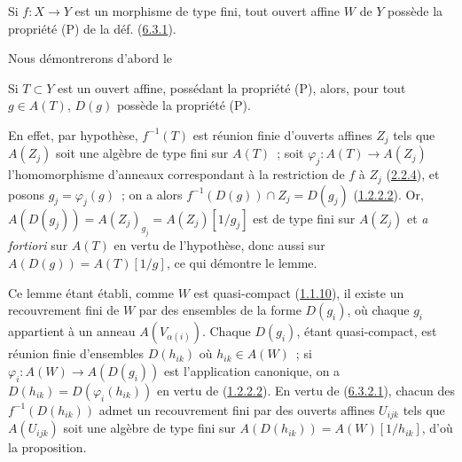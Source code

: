 \begin{proposition}[6.3.2]
\label{I.6.3.2-fr}
Si $f:X\to Y$ est un morphisme de type fini, tout ouvert affine $W$ de $Y$
possède la propriété (P) de la déf. (\hyperref[I.6.3.1-fr]{6.3.1}).
\end{proposition}

Nous démontrerons d'abord le

\begin{lemma}[6.3.2.1]
\label{I.6.3.2.1-fr}
Si $T\subset Y$ est un ouvert affine, possédant la propriété (P), alors, pour
tout $g\in A(T)$, $D(g)$ possède la propriété (P).
\end{lemma}

En effet, par hypothèse, $f^{-1}(T)$ est réunion finie d'ouverts affines
$Z_j$ tels que $A(Z_j)$ soit une algèbre de type fini sur $A(T)$~; soit
$\varphi_j:A(T)\to A(Z_j)$ l'homomorphisme d'anneaux correspondant à la
restriction de $f$ à $Z_j$ (\hyperref[I.2.2.4-fr]{2.2.4}), et posons
$g_j=\varphi_j(g)$~; on a alors
$f^{-1}(D(g))\cap Z_j=D(g_j)$
(\hyperref[I.1.2.2.2-fr]{1.2.2.2}). Or,
$A(D(g_j))=A(Z_j)_{g_j}=A(Z_j)[1/g_j]$ est de type fini sur $A(Z_j)$ et
\emph{a fortiori} sur $A(T)$ en vertu de l'hypothèse, donc aussi sur
$A(D(g))=A(T)[1/g]$, ce qui démontre le lemme.

Ce lemme étant établi, comme $W$ est quasi-compact
(\hyperref[I.1.1.10-fr]{1.1.10}), il existe un recouvrement fini de $W$ par
des ensembles de la forme $D(g_i)$, où chaque $g_i$ appartient à un anneau
$A(V_{\alpha(i)})$. Chaque $D(g_i)$, étant quasi-compact, est réunion finie
d'ensembles $D(h_{ik})$ où $h_{ik}\in A(W)$~; si
$\varphi_i:A(W)\to A(D(g_i))$ est l'application canonique, on a
$D(h_{ik})=D(\varphi_i(h_{ik}))$ en vertu de
(\hyperref[I.1.2.2.2-fr]{1.2.2.2}). En vertu de
(\hyperref[I.6.3.2.1-fr]{6.3.2.1}), chacun des
$f^{-1}(D(h_{ik}))$ admet un recouvrement fini par des ouverts affines
$U_{ijk}$ tels que $A(U_{ijk})$ soit une algèbre de type fini sur
$A(D(h_{ik}))=A(W)[1/h_{ik}]$, d'où la proposition.

